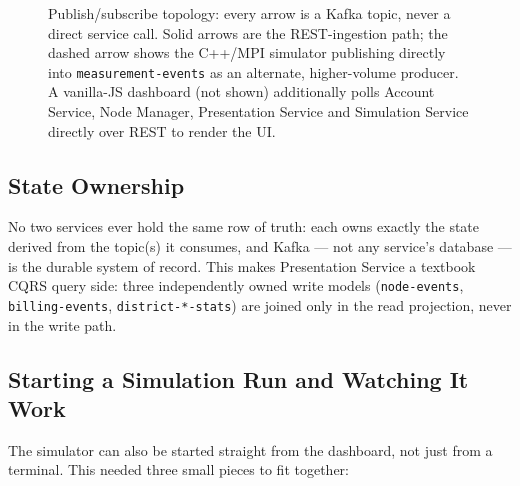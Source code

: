 \begin{figure}[h]
{
}
\caption{Publish/subscribe topology: every arrow is a Kafka topic, never a direct service call.
  Solid arrows are the REST-ingestion path; the dashed arrow shows the C++/MPI simulator
  publishing directly into \texttt{measurement-events} as an alternate, higher-volume producer.
  A vanilla-JS dashboard (not shown) additionally polls Account Service, Node Manager,
  Presentation Service and Simulation Service directly over REST to render the UI.}
\label{fig:arch}
\end{figure}

\subsection*{State Ownership}
No two services ever hold the same row of truth: each owns exactly the state derived from the
topic(s) it consumes, and Kafka --- not any service's database --- is the durable system of
record. This makes Presentation Service a textbook CQRS query side: three independently owned
write models (\texttt{node-events}, \texttt{billing-events}, \texttt{district-*-stats}) are
joined only in the read projection, never in the write path.

\subsection*{Starting a Simulation Run and Watching It Work}
The simulator can also be started straight from the dashboard, not just from a terminal. This
needed three small pieces to fit together:

